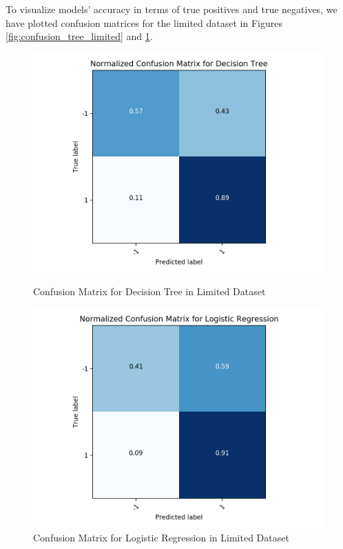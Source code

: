 \documentclass[12pt,twocolumn]{article}
\begin{document}
To visualize models' accuracy in terms of true positives and true negatives, we have plotted confusion matrices for the limited dataset in Figures \ref{fig:confusion_tree_limited} and \ref{fig:logreg_limited}. %
\begin{figure}
\centering
\begin{minipage}{0.48\linewidth}

\includegraphics[width=\linewidth]{confusion_tree_limited}
\caption{Confusion Matrix for Decision Tree in Limited Dataset}
\label{fig:confusion_tree_limited}
\end{minipage}\hfill
\begin{minipage}{0.48\linewidth}

\includegraphics[width=\linewidth]{logreg_limited}
\caption{Confusion Matrix for Logistic Regression in Limited Dataset}
\label{fig:logreg_limited}
 \end{minipage}
\end{figure}
\end{document}

